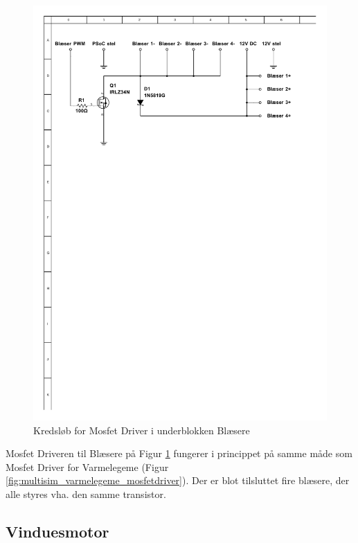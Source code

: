 \clearpage
 
\begin{figure}[h]
\centering 
\includegraphics[width={\textwidth}, trim= 40 550 70 70, clip=true] {../fig/multisim_blaesere_mosfetdriver.pdf}
\caption{Kredsløb for Mosfet Driver i underblokken Blæsere}
\label{fig:multisim_blaesere_mosfetdriver}
\end{figure}

Mosfet Driveren til Blæsere på Figur \ref{fig:multisim_blaesere_mosfetdriver} fungerer i princippet på samme måde som Mosfet Driver for Varmelegeme (Figur \ref{fig:multisim_varmelegeme_mosfetdriver}).
Der er blot tilsluttet fire blæsere, der alle styres vha. den samme transistor. 

\clearpage

\subsection{Vinduesmotor}

